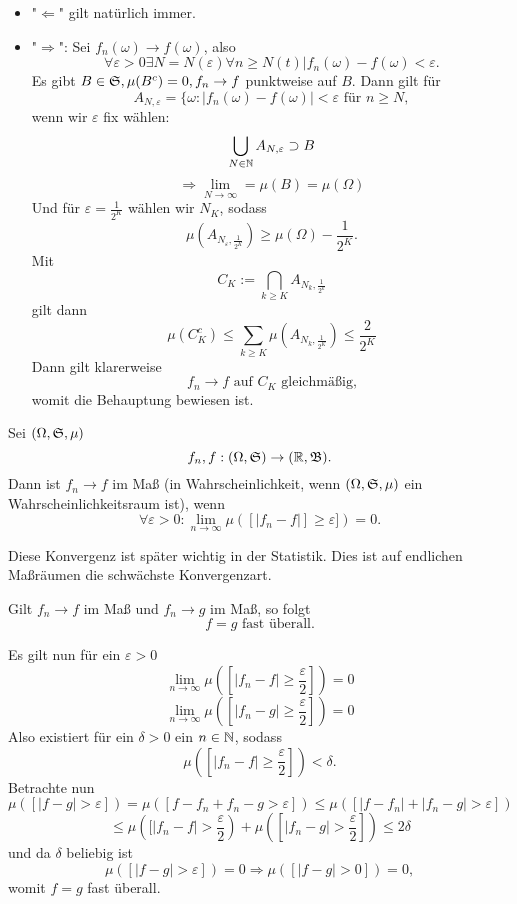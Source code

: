 			\begin{bew}$ $
				\begin{itemize}
					\item "$\Leftarrow$" gilt natürlich immer.
					\item "$\Rightarrow$":\newline
					Sei $f_n(\omega)\to f(\omega)$, also
					\[ \forall \varepsilon>0\exists N=N(\varepsilon)\forall n\ge N(t) |f_n(\omega)-f(\omega)<\varepsilon. \]
					Es gibt $B\in\mathfrak{S}, \mu(B^c)=0, f_n\to f$ punktweise auf $B$. Dann gilt für
					\[ A_{N,\varepsilon}=\{\omega:|f_n(\omega)-f(\omega)|<\varepsilon \text{ für }n\ge N, \]
					wenn wir $\varepsilon$ fix wählen:
					\[ \bigcup_{N\in\mathbb{N}}A_{N,\varepsilon}\supset B \]
					\[ \Rightarrow \lim_{N\to\infty}=\mu(B)=\mu(\Omega) \]
					Und für $\varepsilon=\frac{1}{2^K}$ wählen wir $N_K$, sodass
					\[ \mu(A_{N_\varepsilon,\frac{1}{2^K}})\ge\mu(\Omega)-\frac{1}{2^K}. \]
					Mit 
					\[ C_K:=\bigcap_{k\ge K} A_{N_k,\frac{1}{2^k}} \]
					gilt dann
					\[ \mu(C_K^c)\le\sum_{k\ge K}\mu(A_{N_k,\frac{1}{2^K}})\le \frac{2}{2^K} \]
					Dann gilt klarerweise
					\[ f_n\to f\text{ auf }C_K\text{ gleichmäßig,} \]
					womit die Behauptung bewiesen ist. 
				\end{itemize}
			\end{bew}
			
			\begin{defi}
				Sei $(\Omega,\mathfrak{S},\mu)$
				\[ f_n,f: (\Omega,\mathfrak{S})\to(\mathbb{R},\mathfrak{B}). \]
				Dann ist $f_n\to f$ im Maß (in Wahrscheinlichkeit, wenn $(\Omega, \mathfrak{S},\mu)$ ein Wahrscheinlichkeitsraum ist), wenn
				\[ \forall \varepsilon>0: \lim_{n\to\infty}\mu([|f_n-f|]\ge\varepsilon])=0. \]
			\end{defi}
			
			\begin{bem}
				Diese Konvergenz ist später wichtig in der Statistik. Dies ist auf endlichen Maßräumen die schwächste Konvergenzart. 
			\end{bem}
			
			\begin{satz}
				Gilt $f_n\to f$ im Maß und $f_n\to g$ im Maß, so folgt
				\[ f=g \text{ fast überall}. \]
			\end{satz}
			
			\begin{bew}
				Es gilt nun für ein $\varepsilon>0$
				\[ \lim_{n\to\infty} \mu([|f_n-f|\ge \frac{\varepsilon}{2}])=0 \]
				\[ \lim_{n\to\infty} \mu([|f_n-g|\ge \frac{\varepsilon}{2}])=0 \]
				Also existiert für ein $\delta>0$ ein $n\in\mathbb{N}$, sodass
				\[ \mu([|f_n-f|\ge\frac{\varepsilon}{2}])<\delta. \]
				Betrachte nun
				\[ \mu([|f-g|>\varepsilon])=\mu([f-f_n+f_n-g>\varepsilon])\le\mu([|f-f_n|+|f_n-g|>\varepsilon]) \]
				\[ \le \mu([|f_n-f|>\frac{\varepsilon}{2})+\mu([|f_n-g|>\frac{\varepsilon}{2}])\le 2\delta \]
				und da $\delta$ beliebig ist
				\[ \mu([|f-g|>\varepsilon])=0\Rightarrow\mu([|f-g|>0])=0, \]
				womit $f=g$ fast überall. 
			\end{bew}
			
